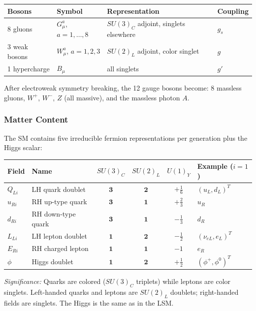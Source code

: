 \begin{center}
\renewcommand{\arraystretch}{1.3}
\begin{tabular}{@{}llll@{}}
  \toprule
  Bosons & Symbol & Representation & Coupling\\
  \midrule
  8 gluons & $G^a_\mu$, $a=1,\ldots,8$ & $SU(3)_C$ adjoint, singlets elsewhere & $g_s$\\
  3 weak bosons & $W^a_\mu$, $a=1,2,3$ & $SU(2)_L$ adjoint, color singlet & $g$\\
  1 hypercharge & $B_\mu$ & all singlets & $g'$\\
  \bottomrule
\end{tabular}
\end{center}

After electroweak symmetry breaking, the 12 gauge bosons become:
8 massless gluons, $W^+$, $W^-$, $Z$ (all massive), and the massless
photon $A$.

\subsubsection*{Matter Content}

The SM contains five irreducible fermion representations per generation
plus the Higgs scalar:

\begin{center}
\renewcommand{\arraystretch}{1.3}
\begin{tabular}{@{}llcccl@{}}
  \toprule
  Field & Name & $SU(3)_C$ & $SU(2)_L$ & $U(1)_Y$ & Example ($i=1$)\\
  \midrule
  $Q_{Li}$ & LH quark doublet & $\mathbf3$ & $\mathbf2$ & $+\tfrac16$ & $(u_L,d_L)^T$\\
  $u_{Ri}$ & RH up-type quark & $\mathbf3$ & $\mathbf1$ & $+\tfrac23$ & $u_R$\\
  $d_{Ri}$ & RH down-type quark & $\mathbf3$ & $\mathbf1$ & $-\tfrac13$ & $d_R$\\
  $L_{Li}$ & LH lepton doublet & $\mathbf1$ & $\mathbf2$ & $-\tfrac12$ & $(\nu_{eL},e_L)^T$\\
  $E_{Ri}$ & RH charged lepton & $\mathbf1$ & $\mathbf1$ & $-1$ & $e_R$\\
  \midrule
  $\phi$ & Higgs doublet & $\mathbf1$ & $\mathbf2$ & $+\tfrac12$ & $(\phi^+,\phi^0)^T$\\
  \bottomrule
\end{tabular}
\end{center}

\textit{Significance:} Quarks are colored ($SU(3)_C$ triplets) while
leptons are color singlets. Left-handed quarks and leptons are $SU(2)_L$
doublets; right-handed fields are singlets. The Higgs is the same as
in the LSM.

